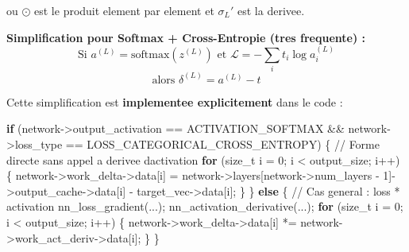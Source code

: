 \documentclass[
  letterpaper,
  DIV=11,
  numbers=noendperiod]{scrartcl}
\newenvironment{Shaded}{\begin{snugshade}}{\end{snugshade}}
\newcommand{\CommentTok}[1]{\textcolor[rgb]{0.37,0.37,0.37}{#1}}
\newcommand{\ControlFlowTok}[1]{\textcolor[rgb]{0.00,0.23,0.31}{\textbf{#1}}}
\newcommand{\DataTypeTok}[1]{\textcolor[rgb]{0.68,0.00,0.00}{#1}}
\newcommand{\DecValTok}[1]{\textcolor[rgb]{0.68,0.00,0.00}{#1}}
\newcommand{\NormalTok}[1]{\textcolor[rgb]{0.00,0.23,0.31}{#1}}
\newcommand{\OperatorTok}[1]{\textcolor[rgb]{0.37,0.37,0.37}{#1}}
\begin{document}
ou \(\odot\) est le produit element par element et \(\sigma_L'\) est la derivee.

\textbf{Simplification pour Softmax + Cross-Entropie (tres frequente) :}
\[\text{Si } a^{(L)} = \text{softmax}(z^{(L)}) \text{ et } \mathcal{L} = -\sum_i t_i \log a_i^{(L)}\]
\[\text{alors } \delta^{(L)} = a^{(L)} - t\]

Cette simplification est \textbf{implementee explicitement} dans le code :

\begin{Shaded}
\begin{Highlighting}[]
\ControlFlowTok{if} \OperatorTok{(}\NormalTok{network}\OperatorTok{{-}\textgreater{}}\NormalTok{output\_activation }\OperatorTok{==}\NormalTok{ ACTIVATION\_SOFTMAX }\OperatorTok{\&\&}
\NormalTok{    network}\OperatorTok{{-}\textgreater{}}\NormalTok{loss\_type }\OperatorTok{==}\NormalTok{ LOSS\_CATEGORICAL\_CROSS\_ENTROPY}\OperatorTok{)} \OperatorTok{\{}
    \CommentTok{// Forme directe sans appel a derivee d\textquotesingle{}activation}
    \ControlFlowTok{for} \OperatorTok{(}\DataTypeTok{size\_t}\NormalTok{ i }\OperatorTok{=} \DecValTok{0}\OperatorTok{;}\NormalTok{ i }\OperatorTok{\textless{}}\NormalTok{ output\_size}\OperatorTok{;}\NormalTok{ i}\OperatorTok{++)} \OperatorTok{\{}
\NormalTok{        network}\OperatorTok{{-}\textgreater{}}\NormalTok{work\_delta}\OperatorTok{{-}\textgreater{}}\NormalTok{data}\OperatorTok{[}\NormalTok{i}\OperatorTok{]} \OperatorTok{=}
\NormalTok{            network}\OperatorTok{{-}\textgreater{}}\NormalTok{layers}\OperatorTok{[}\NormalTok{network}\OperatorTok{{-}\textgreater{}}\NormalTok{num\_layers }\OperatorTok{{-}} \DecValTok{1}\OperatorTok{]{-}\textgreater{}}\NormalTok{output\_cache}\OperatorTok{{-}\textgreater{}}\NormalTok{data}\OperatorTok{[}\NormalTok{i}\OperatorTok{]}
            \OperatorTok{{-}}\NormalTok{ target\_vec}\OperatorTok{{-}\textgreater{}}\NormalTok{data}\OperatorTok{[}\NormalTok{i}\OperatorTok{];}
    \OperatorTok{\}}
\OperatorTok{\}} \ControlFlowTok{else} \OperatorTok{\{}
    \CommentTok{// Cas general : loss\textquotesingle{} * activation\textquotesingle{}}
\NormalTok{    nn\_loss\_gradient}\OperatorTok{(...);}
\NormalTok{    nn\_activation\_derivative}\OperatorTok{(...);}
    \ControlFlowTok{for} \OperatorTok{(}\DataTypeTok{size\_t}\NormalTok{ i }\OperatorTok{=} \DecValTok{0}\OperatorTok{;}\NormalTok{ i }\OperatorTok{\textless{}}\NormalTok{ output\_size}\OperatorTok{;}\NormalTok{ i}\OperatorTok{++)} \OperatorTok{\{}
\NormalTok{        network}\OperatorTok{{-}\textgreater{}}\NormalTok{work\_delta}\OperatorTok{{-}\textgreater{}}\NormalTok{data}\OperatorTok{[}\NormalTok{i}\OperatorTok{]} \OperatorTok{*=}\NormalTok{ network}\OperatorTok{{-}\textgreater{}}\NormalTok{work\_act\_deriv}\OperatorTok{{-}\textgreater{}}\NormalTok{data}\OperatorTok{[}\NormalTok{i}\OperatorTok{];}
    \OperatorTok{\}}
\OperatorTok{\}}
\end{Highlighting}
\end{Shaded}
\end{document}
